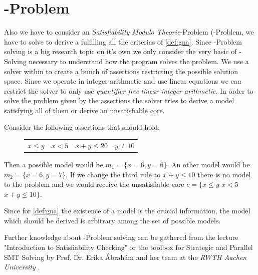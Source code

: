 \section{-Problem}
Also we have to consider an \textit{Satisfiability Modulo Theorie}-Problem (-Problem, we have to solve to derive a \gna fulfilling all the criterias of \autoref{def:gna}. Since -Problem solving is a big research topic on it's own we only consider the very basic of -Solving necessary to understand how the program solves the problem. \newline
We use a solver within \aprove to create a bunch of assertions restricting the possible solution space. Since we operate in integer arithmetic and use linear equations we can restrict the solver to only use \textit{quantifier free linear integer arithmetic}. In order to solve the problem given by the assertions the solver tries to derive a model satisfying all of them or derive an unsatisfiable core. \cite{sat2016}\newline

\begin{example}
	Consider the following assertions that should hold:\newline
	\vspace{-1em}
	\begin{figure}[H]
		\centering
		\begin{tabular}{cccc}
			$x \le y$ &	$x  < 5 $ &	$ x+ y \le 20$ &$y \neq 10$ \\
		\end{tabular}
	\end{figure}
	\vspace{-1em}
	Then a possible model would be $m_1 = \{x=6, y=6\}$. An other model would be $m_2 = \{x=6, y=7\}$. If we change the third rule to $x+y\le 10$ there is no model to the problem and we would receive the unsatisfiable core $c= \{x \le y$ $x  < 5$ $x+ y \le 10 \}$.
\end{example}

Since for \autoref{def:gna} the existence of a model is the crucial information, the model which should be derived is arbitrary among the set of possible models.

Further knowledge about -Problem solving can be gathered from the lecture "Introduction to Satisfiability Checking" or the  toolbox for Strategic and Parallel SMT Solving by Prof. Dr. Erika Ábrahám and her team at the \textit{RWTH Aachen University} \cite{corzilius2015smt}.
